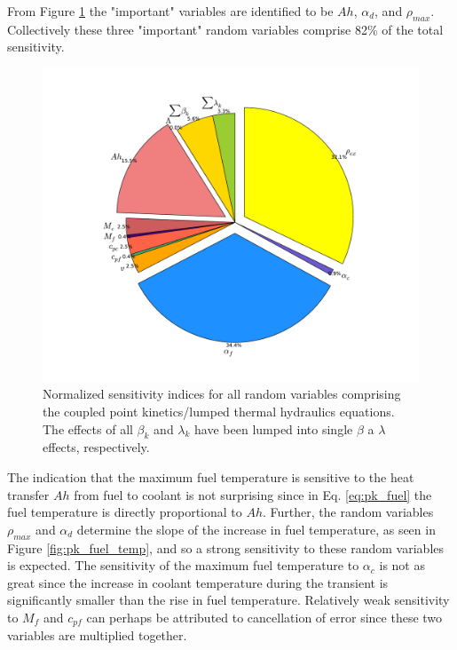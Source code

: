 From Figure \ref{fig:pk_importance_pie} the "important" variables are identified to be $Ah$, $\alpha_d$, and $\rho_{max}$. Collectively these three "important" random variables comprise 82\% of the total sensitivity. 
\begin{figure}[!htb]
\caption{ \label{fig:pk_importance_pie}
Normalized sensitivity indices for all random variables comprising the coupled point kinetics/lumped thermal hydraulics equations. The effects of all $\beta_k$ and $\lambda_k$ have been lumped into single $\beta$ a $\lambda$ effects, respectively. 
}
 \begin{center}
  \includegraphics[scale=.5]{./Chapter3/pk_importance_pie.pdf}
 \end{center}
\end{figure}
The indication that the maximum fuel temperature is sensitive to the heat transfer $Ah$ from fuel to coolant is not surprising since in Eq. \ref{eq:pk_fuel} the fuel temperature is directly proportional to $Ah$. Further, the random variables $\rho_{max}$ and $\alpha_d$ determine the slope of the increase in fuel temperature, as seen in Figure \ref{fig:pk_fuel_temp}, and so a strong sensitivity to these random variables is expected. The sensitivity of the maximum fuel temperature to $\alpha_c$ is not as great since the increase in coolant temperature during the transient is significantly smaller than the rise in fuel temperature. Relatively weak sensitivity to $M_f$ and $c_{pf}$ can perhaps be attributed to cancellation of error since these two variables are multiplied together.

